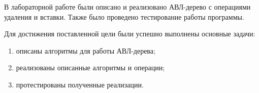 В лабораторной работе были описано и реализовано АВЛ-дерево с операциями удаления и вставки. Также было проведено тестирование работы программы. \par 
Для достижения поставленной цели были успешно выполнены основные задачи: 
\begin{enumerate}
	\item описаны алгоритмы для работы АВЛ-дерева; 
	\item реализованы описанные алгоритмы и операции;
	\item протестированы полученные реализации.
\end{enumerate}